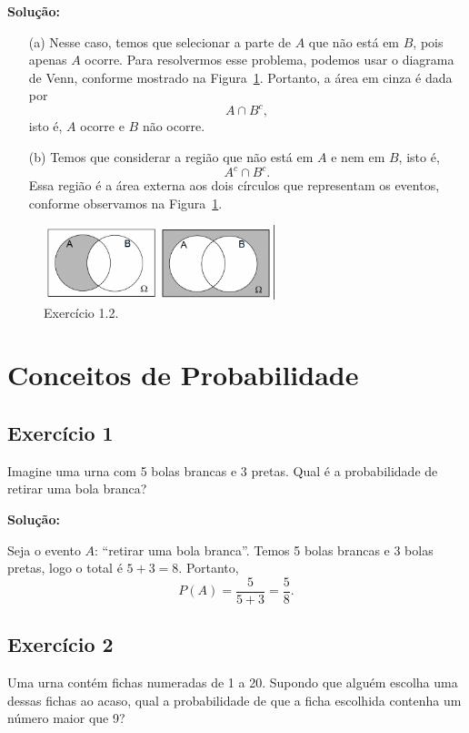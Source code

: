 \documentclass{article}
\begin{document}
\vspace{0.5cm}
\textbf{Solução:}
\begin{itemize}
    \item[(a)] Nesse caso, temos que selecionar a parte de $A$ que não está em $B$, pois apenas $A$ ocorre. Para resolvermos esse problema, podemos usar o diagrama de Venn, conforme mostrado na Figura~\ref{fig:ex_1_2}. Portanto, a área em cinza é dada por $$A \cap B^c,$$ isto é, $A$ ocorre e $B$ não ocorre.  
    \item[(b)] Temos que considerar a região que não está em $A$ e nem em $B$, isto é, $$A^c \cap B^c.$$ Essa região é a área externa aos dois círculos que representam os eventos, conforme observamos na Figura~\ref{fig:ex_1_2}.
\end{itemize}

\begin{figure}[H]
    \centering
    \includegraphics[width=0.6\textwidth]{figuras/ex_1_2.png}
    \caption{Exercício 1.2.}
    \label{fig:ex_1_2}
\end{figure}

\section{Conceitos de Probabilidade}
\subsection{Exercício 1}
Imagine uma urna com 5 bolas brancas e 3 pretas. Qual
é a probabilidade de retirar uma bola branca?

\vspace{0.5cm}
\textbf{Solução:}

Seja o evento $A$: ``retirar uma bola branca''.  
Temos 5 bolas brancas e 3 bolas pretas, logo o total é $5+3=8$.  
Portanto,
    $$
    P(A) = \frac{5}{5+3} = \frac{5}{8}.
    $$

\subsection{Exercício 2}
Uma urna contém fichas numeradas de 1 a 20. Supondo que alguém escolha uma dessas fichas ao acaso, qual a probabilidade de que a ficha escolhida contenha um número maior que 9?
\end{document}
